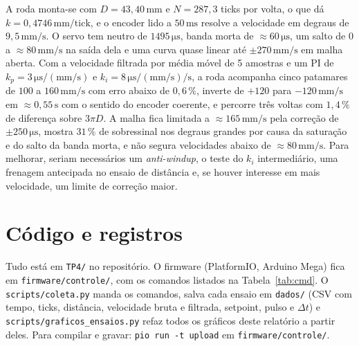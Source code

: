 \documentclass[11pt,a4paper]{article}
\newcommand{\unid}[1]{\,\mathrm{#1}}
\begin{document}
A roda monta-se com $D = 43{,}40\unid{mm}$ e $N = 287{,}3$ ticks por volta, o que dá $k = 0{,}4746\unid{mm/tick}$, e o encoder lido a $50\unid{ms}$ resolve a velocidade em degraus de $9{,}5\unid{mm/s}$. O servo tem neutro de $1495\unid{\mu s}$, banda morta de $\approx 60\unid{\mu s}$, um salto de $0$ a $\approx 80\unid{mm/s}$ na saída dela e uma curva quase linear até $\pm 270\unid{mm/s}$ em malha aberta. Com a velocidade filtrada por média móvel de 5 amostras e um PI de $k_p = 3\unid{\mu s/(mm/s)}$ e $k_i = 8\unid{\mu s/(mm/s)/s}$, a roda acompanha cinco patamares de $100$ a $160\unid{mm/s}$ com erro abaixo de $0{,}6\,\%$, inverte de $+120$ para $-120\unid{mm/s}$ em $\approx 0{,}55\unid{s}$ com o sentido do encoder coerente, e percorre três voltas com $1{,}4\,\%$ de diferença sobre $3\pi D$. A malha fica limitada a $\approx 165\unid{mm/s}$ pela correção de $\pm 250\unid{\mu s}$, mostra $31\,\%$ de sobressinal nos degraus grandes por causa da saturação e do salto da banda morta, e não segura velocidades abaixo de $\approx 80\unid{mm/s}$. Para melhorar, seriam necessários um \textit{anti-windup}, o teste do $k_i$ intermediário, uma frenagem antecipada no ensaio de distância e, se houver interesse em mais velocidade, um limite de correção maior.

\section*{Código e registros}

\begingroup\sloppy
Tudo está em \texttt{TP4/} no repositório. O firmware (PlatformIO, Arduino Mega) fica em \texttt{firmware/controle/}, com os comandos listados na Tabela~\ref{tab:cmd}. O \texttt{scripts/coleta.py} manda os comandos, salva cada ensaio em \texttt{dados/} (CSV com tempo, ticks, distância, velocidade bruta e filtrada, setpoint, pulso e $\Delta t$) e \texttt{scripts/graficos\_ensaios.py} refaz todos os gráficos deste relatório a partir deles. Para compilar e gravar: \texttt{pio run -t upload} em \texttt{firmware/controle/}.\par
\endgroup
\end{document}
